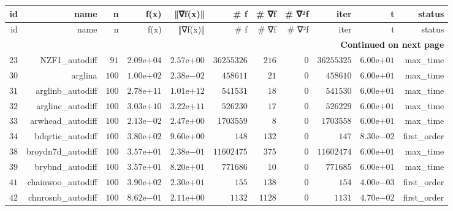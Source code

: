 \documentclass[varwidth=20cm,crop=true]{standalone}
\begin{document}
\begin{longtable}{rrrrrrrrrrr}
  \hline
  id & name & n & f(x) & ‖∇f(x)‖ & # f & # ∇f & # ∇²f & iter & t & status \\\hline
  \endfirsthead
  \hline
  id & name & n & f(x) & ‖∇f(x)‖ & # f & # ∇f & # ∇²f & iter & t & status \\\hline
  \endhead
  \hline
  \multicolumn{11}{r}{{\bfseries Continued on next page}}\\
  \hline
  \endfoot
  \endlastfoot
  \(    23\) & NZF1\_autodiff & \(    91\) & \( 2.09\)e\(+04\) & \( 2.57\)e\(+00\) & \(36255326\) & \(   216\) & \(     0\) & \(36255325\) & \( 6.00\)e\(+01\) & max\_time \\
  \(    30\) & arglina & \(   100\) & \( 1.00\)e\(+02\) & \( 2.38\)e\(-02\) & \(458611\) & \(    21\) & \(     0\) & \(458610\) & \( 6.00\)e\(+01\) & max\_time \\
  \(    31\) & arglinb\_autodiff & \(   100\) & \( 2.78\)e\(+11\) & \( 1.01\)e\(+12\) & \(541531\) & \(    18\) & \(     0\) & \(541530\) & \( 6.00\)e\(+01\) & max\_time \\
  \(    32\) & arglinc\_autodiff & \(   100\) & \( 3.03\)e\(+10\) & \( 3.22\)e\(+11\) & \(526230\) & \(    17\) & \(     0\) & \(526229\) & \( 6.00\)e\(+01\) & max\_time \\
  \(    33\) & arwhead\_autodiff & \(   100\) & \( 2.13\)e\(-02\) & \( 2.47\)e\(+00\) & \(1703559\) & \(     8\) & \(     0\) & \(1703558\) & \( 6.00\)e\(+01\) & max\_time \\
  \(    34\) & bdqrtic\_autodiff & \(   100\) & \( 3.80\)e\(+02\) & \( 9.60\)e\(+00\) & \(   148\) & \(   132\) & \(     0\) & \(   147\) & \( 8.30\)e\(-02\) & first\_order \\
  \(    38\) & broydn7d\_autodiff & \(   100\) & \( 3.57\)e\(+01\) & \( 2.38\)e\(-01\) & \(11602475\) & \(   375\) & \(     0\) & \(11602474\) & \( 6.00\)e\(+01\) & max\_time \\
  \(    39\) & brybnd\_autodiff & \(   100\) & \( 3.57\)e\(+01\) & \( 8.20\)e\(+01\) & \(771686\) & \(    10\) & \(     0\) & \(771685\) & \( 6.00\)e\(+01\) & max\_time \\
  \(    41\) & chainwoo\_autodiff & \(   100\) & \( 3.90\)e\(+02\) & \( 2.30\)e\(+01\) & \(   155\) & \(   138\) & \(     0\) & \(   154\) & \( 4.00\)e\(-03\) & first\_order \\
  \(    42\) & chnrosnb\_autodiff & \(   100\) & \( 8.62\)e\(-01\) & \( 2.11\)e\(+00\) & \(  1132\) & \(  1128\) & \(     0\) & \(  1131\) & \( 4.70\)e\(-02\) & first\_order \\

\end{longtable}
\end{document}

